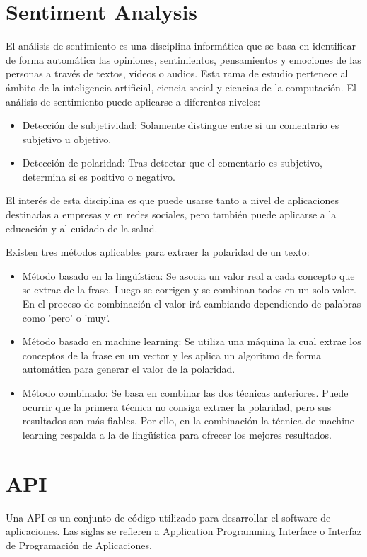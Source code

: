 
\section{Sentiment Analysis}
El análisis de sentimiento \cite{sentiment_analysis} es una disciplina informática que se basa en identificar de forma automática las opiniones, sentimientos, pensamientos y emociones de las personas a través de textos, vídeos o audios. Esta rama de estudio pertenece al ámbito de la inteligencia artificial, ciencia social y ciencias de la computación.
El análisis de sentimiento puede aplicarse a diferentes niveles:
\begin{itemize}
\tightlist
    \item Detección de subjetividad: Solamente distingue entre si un comentario es subjetivo u objetivo.
    \item Detección de polaridad: Tras detectar que el comentario es subjetivo, determina si es positivo o negativo.
\end{itemize}

El interés de esta disciplina es que puede usarse tanto a nivel de aplicaciones destinadas a empresas y en redes sociales, pero también puede aplicarse a la educación y al cuidado de la salud.

Existen tres métodos aplicables para extraer la polaridad de un texto:
\begin{itemize}
\tightlist
    \item Método basado en la lingüística: Se asocia un valor real a cada concepto que se extrae de la frase. Luego se corrigen y se combinan todos en un solo valor. En el proceso de combinación el valor irá cambiando dependiendo de palabras como 'pero' o 'muy'.
    \item Método basado en machine learning: Se utiliza una máquina la cual extrae los conceptos de la frase en un vector y les aplica un algoritmo de forma automática para generar el valor de la polaridad.
    \item Método combinado: Se basa en combinar las dos técnicas anteriores. Puede ocurrir que la primera técnica no consiga extraer la polaridad, pero sus resultados son más fiables. Por ello, en la combinación la técnica de machine learning respalda a la de lingüística para ofrecer los mejores resultados.
\end{itemize}

\section{API}
Una API \cite{api} es un conjunto de código utilizado para desarrollar el software de aplicaciones. 
Las siglas se refieren a Application Programming Interface o Interfaz de Programación de Aplicaciones.

